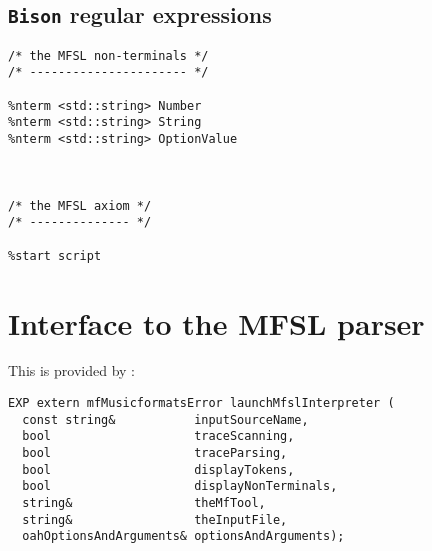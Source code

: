 \subsection{{\tt Bison} regular expressions}

\begin{lstlisting}[language=Bison]
/* the MFSL non-terminals */
/* ---------------------- */

%nterm <std::string> Number
%nterm <std::string> String
%nterm <std::string> OptionValue



/* the MFSL axiom */
/* -------------- */

%start script
\end{lstlisting}


\section{Interface to the MFSL parser}

This is provided by :
\begin{lstlisting}[language=Terminal]
EXP extern mfMusicformatsError launchMfslInterpreter (
  const string&           inputSourceName,
  bool                    traceScanning,
  bool                    traceParsing,
  bool                    displayTokens,
  bool                    displayNonTerminals,
  string&                 theMfTool,
  string&                 theInputFile,
  oahOptionsAndArguments& optionsAndArguments);
\end{lstlisting}


